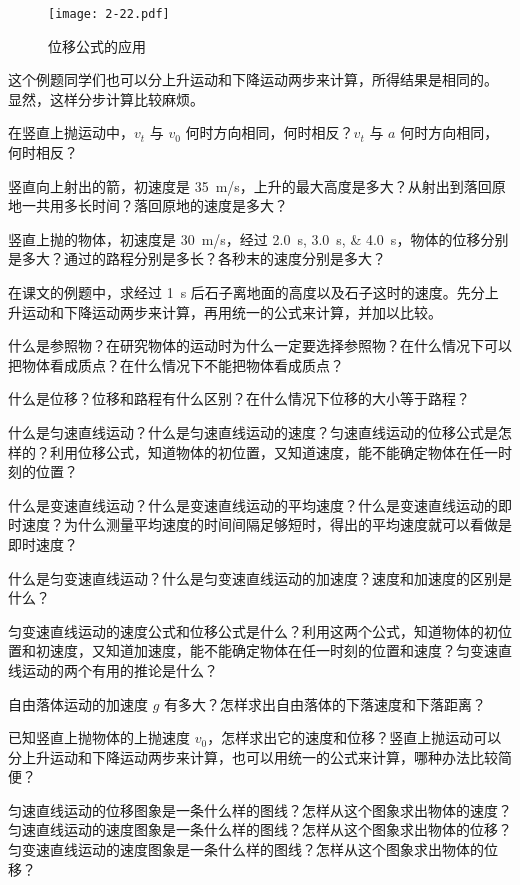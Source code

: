 \begin{figure}
  \texttt{[image: 2-22.pdf]}
  \caption{位移公式的应用}\label{fig:2-22}
\end{figure}

这个例题同学们也可以分上升运动和下降运动两步来计算，所得结果是相同的。
显然，这样分步计算比较麻烦。

\begin{Practice}
\begin{question}
	\item 在竖直上抛运动中，$v_t$ 与 $v_0$ 何时方向相同，何时相反？$v_t$ 与 $a$ 何时方向相同，何时相反？
  \item 竖直向上射出的箭，初速度是 \qty{35}{m/s}，上升的最大高度是多大？从射出到落回原地一共用多长时间？落回原地的速度是多大？
  \item 竖直上抛的物体，初速度是 \qty{30}{m/s}，经过 \qtylist{2.0;3.0;4.0}{s}，物体的位移分别是多大？通过的路程分别是多长？各秒末的速度分别是多大？
  \item 在课文的例题中，求经过 \qty{1}{s} 后石子离地面的高度以及石子这时的速度。先分上升运动和下降运动两步来计算，再用统一的公式来计算，并加以比较。
\end{question}
\end{Practice}

\begin{Review}
\begin{question}
  \item 什么是参照物？在研究物体的运动时为什么一定要选择参照物？在什么情况下可以把物体看成质点？在什么情况下不能把物体看成质点？
  \item 什么是位移？位移和路程有什么区别？在什么情况下位移的大小等于路程？
  \item 什么是匀速直线运动？什么是匀速直线运动的速度？匀速直线运动的位移公式是怎样的？利用位移公式，知道物体的初位置，又知道速度，能不能确定物体在任一时刻的位置？
  \item 什么是变速直线运动？什么是变速直线运动的平均速度？什么是变速直线运动的即时速度？为什么测量平均速度的时间间隔足够短时，得出的平均速度就可以看做是即时速度？
  \item 什么是匀变速直线运动？什么是匀变速直线运动的加速度？速度和加速度的区别是什么？
  \item 匀变速直线运动的速度公式和位移公式是什么？利用这两个公式，知道物体的初位置和初速度，又知道加速度，能不能确定物体在任一时刻的位置和速度？匀变速直线运动的两个有用的推论是什么？
  \item 自由落体运动的加速度 $g$ 有多大？怎样求出自由落体的下落速度和下落距离？
  \item 已知竖直上抛物体的上抛速度 $v_0$，怎样求出它的速度和位移？竖直上抛运动可以分上升运动和下降运动两步来计算，也可以用统一的公式来计算，哪种办法比较简便？
  \item 匀速直线运动的位移图象是一条什么样的图线？怎样从这个图象求出物体的速度？匀速直线运动的速度图象是一条什么样的图线？怎样从这个图象求出物体的位移？匀变速直线运动的速度图象是一条什么样的图线？怎样从这个图象求出物体的位移？
\end{question}
\end{Review}

